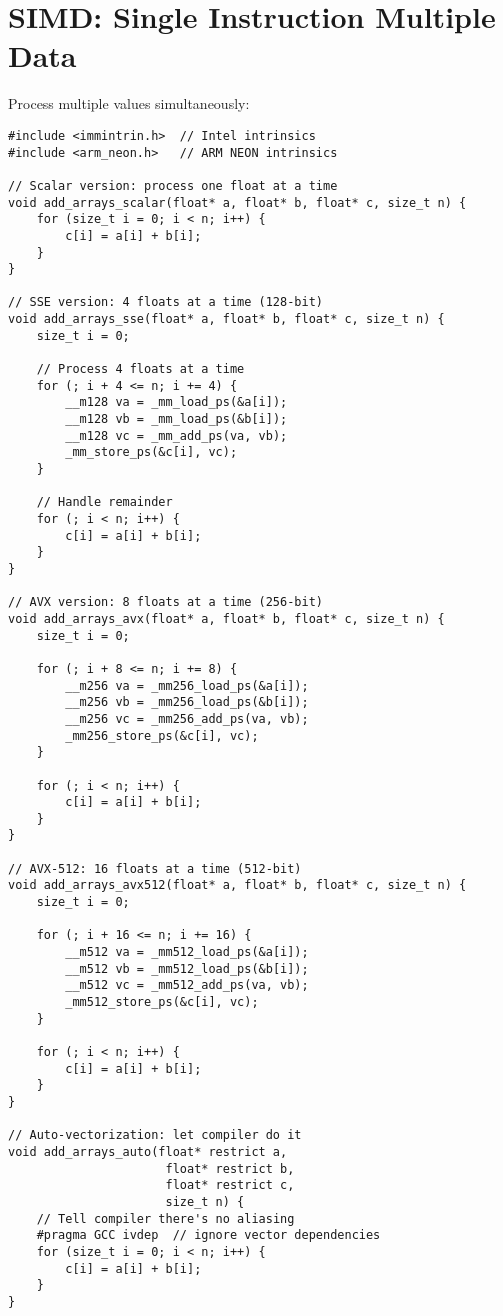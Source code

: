 \section{SIMD: Single Instruction Multiple Data}

Process multiple values simultaneously:

\begin{lstlisting}
#include <immintrin.h>  // Intel intrinsics
#include <arm_neon.h>   // ARM NEON intrinsics

// Scalar version: process one float at a time
void add_arrays_scalar(float* a, float* b, float* c, size_t n) {
    for (size_t i = 0; i < n; i++) {
        c[i] = a[i] + b[i];
    }
}

// SSE version: 4 floats at a time (128-bit)
void add_arrays_sse(float* a, float* b, float* c, size_t n) {
    size_t i = 0;

    // Process 4 floats at a time
    for (; i + 4 <= n; i += 4) {
        __m128 va = _mm_load_ps(&a[i]);
        __m128 vb = _mm_load_ps(&b[i]);
        __m128 vc = _mm_add_ps(va, vb);
        _mm_store_ps(&c[i], vc);
    }

    // Handle remainder
    for (; i < n; i++) {
        c[i] = a[i] + b[i];
    }
}

// AVX version: 8 floats at a time (256-bit)
void add_arrays_avx(float* a, float* b, float* c, size_t n) {
    size_t i = 0;

    for (; i + 8 <= n; i += 8) {
        __m256 va = _mm256_load_ps(&a[i]);
        __m256 vb = _mm256_load_ps(&b[i]);
        __m256 vc = _mm256_add_ps(va, vb);
        _mm256_store_ps(&c[i], vc);
    }

    for (; i < n; i++) {
        c[i] = a[i] + b[i];
    }
}

// AVX-512: 16 floats at a time (512-bit)
void add_arrays_avx512(float* a, float* b, float* c, size_t n) {
    size_t i = 0;

    for (; i + 16 <= n; i += 16) {
        __m512 va = _mm512_load_ps(&a[i]);
        __m512 vb = _mm512_load_ps(&b[i]);
        __m512 vc = _mm512_add_ps(va, vb);
        _mm512_store_ps(&c[i], vc);
    }

    for (; i < n; i++) {
        c[i] = a[i] + b[i];
    }
}

// Auto-vectorization: let compiler do it
void add_arrays_auto(float* restrict a,
                      float* restrict b,
                      float* restrict c,
                      size_t n) {
    // Tell compiler there's no aliasing
    #pragma GCC ivdep  // ignore vector dependencies
    for (size_t i = 0; i < n; i++) {
        c[i] = a[i] + b[i];
    }
}


\end{lstlisting}
